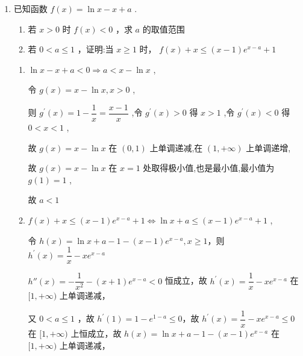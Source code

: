 \begin{enumerate}
\begin{enumerate}
        \item 已知函数 $f\left( x\right)  = \ln x - x + a$ .
        \begin{enumerate}
            \item 若 $x > 0$ 时 $f\left( x\right)  < 0$ ，求 $a$ 的取值范围
            \item 若 $0 < a \leq  1$ ，证明:当 $x \geq  1$ 时， $f\left( x\right)  + x \leq  \left( {x - 1}\right) {{e}}^{x - a} + 1$ 
        \end{enumerate}
        \begin{jieda}
            \begin{enumerate}
                \item $\ln x - x + a < 0 \Longrightarrow  a < x - \ln x$ ,
                
                令 $g\left( x\right)  = x - \ln x,x > 0$ ,
                
                则 ${g}^{\prime }\left( x\right)  = 1 - \dfrac{1}{x} = \dfrac{x - 1}{x}$ ,令 ${g}^{\prime }\left( x\right)  > 0$ 得 $x > 1$ ,令 ${g}^{\prime }\left( x\right)  < 0$ 得 $0 < x < 1$ ,
                
                故 $g\left( x\right)  = x - \ln x$ 在 $\left( {0,1}\right)$ 上单调递减,在 $\left( {1, + \infty }\right)$ 上单调递增,
                
                故 $g\left( x\right)  = x - \ln x$ 在 $x = 1$ 处取得极小值,也是最小值,最小值为 $g\left( 1\right)  = 1$ ,
                
                故 $a < 1$

                \item $f\left( x\right)  + x \leq  \left( {x - 1}\right) {{e}}^{x - a} + 1 \Longleftrightarrow  \ln x + a \leq  \left( {x - 1}\right) {{e}}^{x - a} + 1$ ,
                
                令 $h\left( x\right)  = \ln x + a - 1 - \left( {x - 1}\right) {{e}}^{x - a},x \geq  1$，则 ${h}^{\prime }\left( x\right)  = \dfrac{1}{x} - x{{e}}^{x - a}$
                
                $h''\left( x\right)  =  - \dfrac{1}{{x}^{2}} - \left( {x + 1}\right) {{e}}^{x - a} < 0$ 恒成立，故 ${h}^{\prime }\left( x\right)  = \dfrac{1}{x} - x{{e}}^{x - a}$ 在 $\lbrack 1, + \infty )$ 上单调递减，
                
                又 $0 < a \leq  1$ ，故 ${h}^{\prime }\left( 1\right)  = 1 - {{e}}^{1 - a} \leq  0$，故 ${h}^{\prime }\left( x\right)  = \dfrac{1}{x} - x{{e}}^{x - a} \leq  0$ 在 $\lbrack 1, + \infty )$ 上恒成立，故 $h\left( x\right)  = \ln x + a - 1 - \left( {x - 1}\right) {{e}}^{x - a}$ 在 $\lbrack 1, + \infty )$ 上单调递减，
                

\end{enumerate}
\end{jieda}
\end{enumerate}
\end{enumerate}
